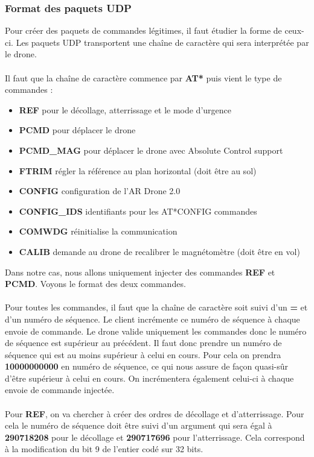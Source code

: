 \subsubsection{Format des paquets UDP}
Pour créer des paquets de commandes légitimes, il faut étudier la forme de ceux-ci. Les paquets UDP transportent une chaîne de caractère qui sera interprétée par le drone.\\\\
Il faut que la chaîne de caractère commence par \textbf{AT*} puis vient le type de commandes :
\begin{itemize}
\item \textbf{REF} pour le décollage, atterrissage et le mode d'urgence
\item \textbf{PCMD} pour déplacer le drone
\item \textbf{PCMD\_MAG} pour déplacer le drone avec Absolute Control support
\item \textbf{FTRIM} régler la référence au plan horizontal (doit être au sol)
\item \textbf{CONFIG} configuration de l'AR Drone 2.0
\item \textbf{CONFIG\_IDS} identifiants pour les AT*CONFIG commandes
\item \textbf{COMWDG} réinitialise la communication
\item \textbf{CALIB} demande au drone de recalibrer le magnétomètre (doit être en vol)
\end{itemize}
Dans notre cas, nous allons uniquement injecter des commandes \textbf{REF} et \textbf{PCMD}. Voyons le format des deux commandes.\\\\
Pour toutes les commandes, il faut que la chaîne de caractère soit suivi d'un \textbf{=} et d'un numéro de séquence. Le client incrémente ce numéro de séquence à chaque envoie de commande. Le drone valide uniquement les commandes donc le numéro de séquence est supérieur au précédent. Il faut donc prendre un numéro de séquence qui est au moins supérieur à celui en cours. Pour cela on prendra \textbf{10000000000} en numéro de séquence, ce qui nous assure de façon quasi-sûr d'être supérieur à celui en cours. On incrémentera également celui-ci à chaque envoie de commande injectée.\\\\
Pour \textbf{REF}, on va chercher à créer des ordres de décollage et d’atterrissage. Pour cela le numéro de séquence doit être suivi d'un argument qui sera égal à \textbf{290718208} pour le décollage et \textbf{290717696} pour l'atterrissage. Cela correspond à la modification du bit 9 de l'entier codé sur 32 bits.\\\\
